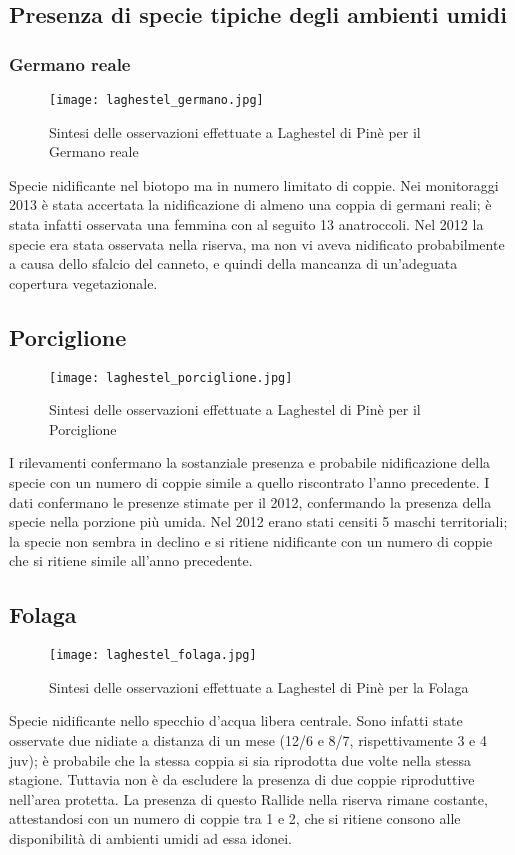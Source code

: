 \documentclass[11pt,a4paper,twoside]{memoir}
\begin{document}
\subsection{Presenza di specie tipiche degli ambienti umidi}
\subsubsection{Germano reale}
\vspace*{\fill}
\begin{figure}[H]
  \centering
  \texttt{[image: laghestel\_germano.jpg]}
  \caption{Sintesi delle osservazioni effettuate a Laghestel di Pinè per il Germano reale}
\end{figure}\vspace*{\fill}
Specie nidificante nel biotopo ma in numero limitato di coppie. 
Nei monitoraggi 2013 è stata accertata la nidificazione di almeno una coppia di germani reali; è stata infatti osservata una femmina con al seguito 13 anatroccoli. Nel 2012 la specie era stata osservata nella riserva, ma non vi aveva nidificato probabilmente a causa dello sfalcio del canneto, e quindi della mancanza di un’adeguata copertura vegetazionale.
\subsection{Porciglione}
\vspace*{\fill}
\begin{figure}[H]
  \centering
  \texttt{[image: laghestel\_porciglione.jpg]}
  \caption{Sintesi delle osservazioni effettuate a Laghestel di Pinè per il Porciglione}
\end{figure}\vspace*{\fill}
I rilevamenti confermano la sostanziale presenza e probabile nidificazione della specie con un numero di coppie simile a quello riscontrato l’anno precedente. 
I dati confermano le presenze stimate per il 2012, confermando la presenza della specie nella porzione più umida. Nel 2012 erano stati censiti 5 maschi territoriali; la specie non sembra in declino e si ritiene nidificante con un numero di coppie che si ritiene simile all’anno precedente.
\subsection{Folaga}
\vspace*{\fill}
\begin{figure}[H]
  \centering
  \texttt{[image: laghestel\_folaga.jpg]}
  \caption{Sintesi delle osservazioni effettuate a Laghestel di Pinè per la Folaga}
\end{figure}\vspace*{\fill}
Specie nidificante nello specchio d’acqua libera centrale. 
Sono infatti state osservate due nidiate a distanza di un mese (12/6 e 8/7, rispettivamente 3 e 4 juv); è probabile che la stessa coppia si sia riprodotta due volte nella stessa stagione. Tuttavia non è da escludere la presenza di due coppie riproduttive nell'area protetta. La presenza di questo Rallide nella riserva rimane costante, attestandosi con un numero di coppie tra 1 e 2, che si ritiene consono alle disponibilità di ambienti umidi ad essa idonei.
\end{document}
